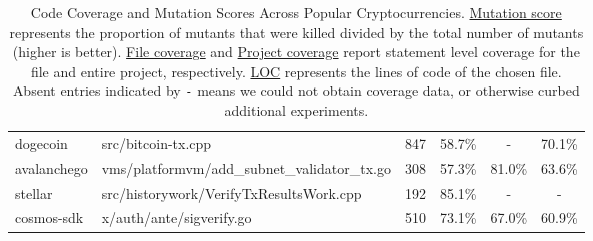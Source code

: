 \begin{table}[ht!]
\begin{tabular}{llrccc}
\cmidrule{2-6}
dogecoin                        & src/bitcoin-tx.cpp                            & 847              & 58.7\%                  & -                       & 70.1\%                   \\
\cmidrule{2-6}
avalanchego                     & vms/platformvm/add\_subnet\_validator\_tx.go  & 308              & 57.3\%                  & 81.0\%                  & 63.6\%                   \\
\cmidrule{2-6}
  stellar                       & src/historywork/VerifyTxResultsWork.cpp       & 192              & 85.1\%                  & -                       & -                        \\
\cmidrule{2-6}
cosmos-sdk                      & x/auth/ante/sigverify.go                      & 510              & 73.1\%                  & 67.0\%                  & 60.9\%                   \\
\bottomrule
\end{tabular}
\caption{Code Coverage and Mutation Scores Across Popular Cryptocurrencies. \underline{Mutation score} represents the proportion of mutants that were killed divided by the total number of mutants (higher is better).
\underline{File coverage} and \underline{Project coverage} report statement level coverage for the file and entire project, respectively. \underline{LOC} represents the lines of code of the chosen file. Absent entries indicated by \texttt{-} means we could not
obtain coverage data, or otherwise curbed additional experiments.
}
\label{tab:comparison}
\end{table}

